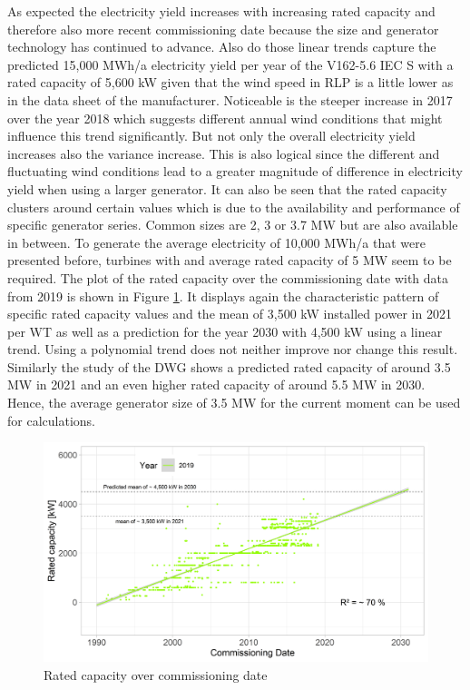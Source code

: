 \documentclass[a4paper,11pt]{article}
\begin{document}
As expected the electricity yield increases with increasing rated capacity and therefore also more recent commissioning date because the size and generator technology has continued to advance. Also do those linear trends capture the predicted 15,000 MWh/a electricity yield per year of the V162-5.6 IEC S with a rated capacity of 5,600 kW given that the wind speed in RLP is a little lower as in the data sheet of the manufacturer. Noticeable is the steeper increase in 2017 over the year 2018 which suggests different annual wind conditions that might influence this trend significantly. But not only the overall electricity yield increases also the variance increase. This is also logical since the different and fluctuating wind conditions lead to a greater magnitude of difference in electricity yield when using a larger generator. It can also be seen that the rated capacity clusters around certain values which is due to the availability and performance of specific generator series. Common sizes are 2, 3 or 3.7 MW but are also available in between. To generate the average electricity of 10,000 MWh/a that were presented before, turbines with and average rated capacity of 5 MW seem to be required. The plot of the rated capacity over the commissioning date with data from 2019 is shown in Figure \ref{fig:ratedcapacity}. It displays again the characteristic pattern of specific rated capacity values and the mean of 3,500 kW installed power in 2021 per WT as well as a prediction for the year 2030 with 4,500 kW using a linear trend. Using a polynomial trend does not neither improve nor change this result. Similarly the study of the DWG shows a predicted rated capacity of around 3.5 MW in 2021 and an even higher rated capacity of around 5.5 MW in 2030. Hence, the average generator size of 3.5 MW for the current moment can be used for calculations.
\begin{figure}

{\centering \includegraphics[width=1\linewidth]{data/Amprion/results_of_analysis/rated_capacity_over_commissioning} 

}

\caption{Rated capacity over commissioning date}\label{fig:ratedcapacity}
\end{figure}
\newpage
\end{document}
